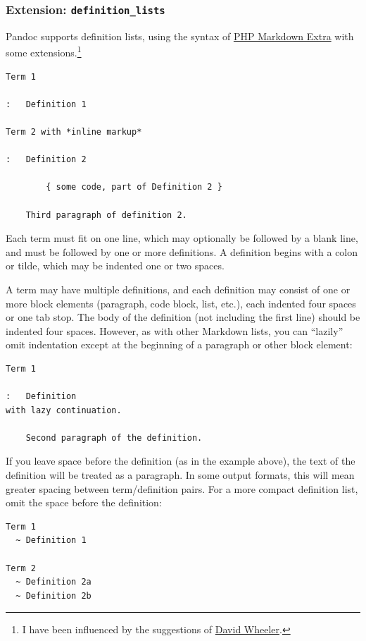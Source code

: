 \documentclass[
]{article}
\begin{document}
\hypertarget{extension-definition_lists}{%
\subsubsection{\texorpdfstring{Extension:
\texttt{definition\_lists}}{Extension: definition\_lists}}\label{extension-definition_lists}}

Pandoc supports definition lists, using the syntax of
\href{https://michelf.ca/projects/php-markdown/extra/}{PHP Markdown
Extra} with some extensions.\footnote{I have been influenced by the
  suggestions of
  \href{https://justatheory.com/2009/02/modest-markdown-proposal/}{David
  Wheeler}.}

\begin{verbatim}
Term 1

:   Definition 1

Term 2 with *inline markup*

:   Definition 2

        { some code, part of Definition 2 }

    Third paragraph of definition 2.
\end{verbatim}

Each term must fit on one line, which may optionally be followed by a
blank line, and must be followed by one or more definitions. A
definition begins with a colon or tilde, which may be indented one or
two spaces.

A term may have multiple definitions, and each definition may consist of
one or more block elements (paragraph, code block, list, etc.), each
indented four spaces or one tab stop. The body of the definition (not
including the first line) should be indented four spaces. However, as
with other Markdown lists, you can ``lazily'' omit indentation except at
the beginning of a paragraph or other block element:

\begin{verbatim}
Term 1

:   Definition
with lazy continuation.

    Second paragraph of the definition.
\end{verbatim}

If you leave space before the definition (as in the example above), the
text of the definition will be treated as a paragraph. In some output
formats, this will mean greater spacing between term/definition pairs.
For a more compact definition list, omit the space before the
definition:

\begin{verbatim}
Term 1
  ~ Definition 1

Term 2
  ~ Definition 2a
  ~ Definition 2b
\end{verbatim}
\end{document}
